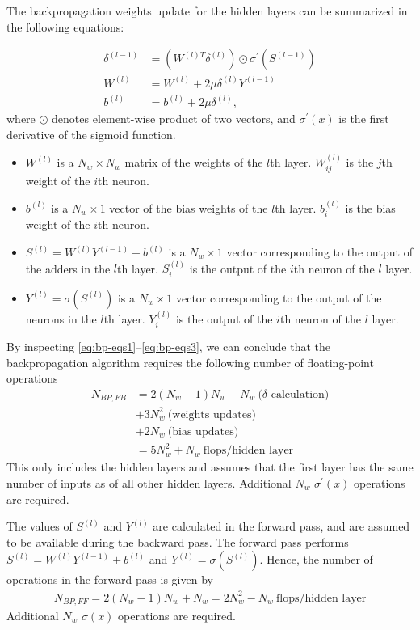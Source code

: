 \documentclass[a4paper]{article}
\begin{document}
The backpropagation weights update for the hidden layers can be summarized in the following equations:

\begin{align} \label{eq:bp-eqs1}
\delta^{(l-1)} &= (W^{(l)T}\delta^{(l)})\odot \sigma^\prime (S^{(l-1)}) \\ \label{eq:bp-eqs2}
W^{(l)} &= W^{(l)} + 2\mu\delta^{(l)}Y^{(l-1)} \\ \label{eq:bp-eqs3}
b^{(l)} &= b^{(l)} +  2\mu\delta^{(l)},
\end{align}
where $\odot$ denotes element-wise product of two vectors, and $\sigma^\prime(x)$ is the first derivative of the sigmoid function.
\begin{itemize}
	\item $W^{(l)}$ is a $N_w \times N_w$ matrix of the weights of the $l$th layer. $W_{ij}^{(l)}$ is the $j$th weight of the $i$th neuron.
	\item $b^{(l)}$ is a $N_w \times 1$ vector of the bias weights of the $l$th layer. $b_i^{(l)}$ is the bias weight of the $i$th neuron.
	\item $S^{(l)} = W^{(l)}Y^{(l-1)} + b^{(l)}$ is a $N_w \times 1$ vector corresponding to the output of the adders in the $l$th layer. $S_i^{(l)}$ is the output of the $i$th neuron of the $l$ layer.
	\item $Y^{(l)} = \sigma(S^{(l)})$ is a $N_w \times 1$ vector corresponding to the output of the neurons in the $l$th layer. $Y_i^{(l)}$ is the output of the $i$th neuron of the $l$ layer.
\end{itemize}

By inspecting \eqref{eq:bp-eqs1}--\eqref{eq:bp-eqs3}, we can conclude that the backpropagation algorithm requires the following number of floating-point operations
\begin{align} \nonumber
N_{BP, FB} &= 2(N_w - 1)N_w + N_w~\text{($\delta$ calculation)} \\ \nonumber
& + 3N_w^2~\text{(weights updates)}\\  \nonumber
& + 2N_w~\text{(bias updates)} \\
& = 5N_w^2 + N_w~\text{flops/hidden layer}
\end{align}
This only includes the hidden layers and assumes that the first layer has the same number of inputs as of all other hidden layers. Additional $N_w$ $\sigma^\prime(x)$ operations are required. 

The values of $S^{(l)}$ and $Y^{(l)}$ are calculated in the forward pass, and are assumed to be available during the backward pass. The forward pass performs $S^{(l)} = W^{(l)}Y^{(l-1)} + b^{(l)}$ and $Y^{(l)} = \sigma(S^{(l)})$. Hence, the number of operations in the forward pass is given by
\begin{align}
N_{BP, FF} = 2(N_w-1)N_w + N_w = 2N_w^2 - N_w ~\text{flops/hidden layer}
\end{align}
Additional $N_w$ $\sigma(x)$ operations are required. 
\end{document}
